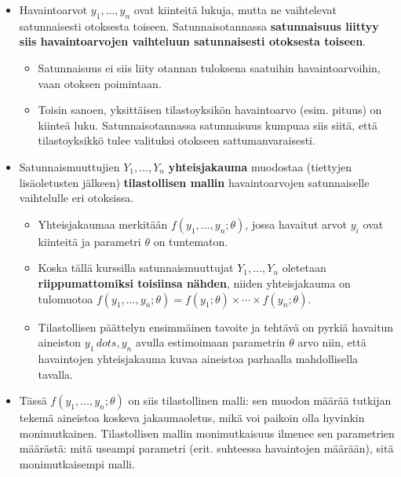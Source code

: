 \documentclass[
]{book}
\providecommand{\tightlist}{%
  \setlength{\itemsep}{0pt}\setlength{\parskip}{0pt}}
\begin{document}
\begin{itemize}
\tightlist
\item
  Havaintoarvot \(y_1, \dots, y_n\) ovat kiinteitä lukuja, mutta ne vaihtelevat satunnaisesti otoksesta toiseen. Satunnaisotannassa \textbf{satunnaisuus liittyy siis havaintoarvojen vaihteluun satunnaisesti otoksesta toiseen}.

  \begin{itemize}
  \tightlist
  \item
    Satunnaisuus ei siis liity otannan tuloksena saatuihin havaintoarvoihin, vaan otoksen poimintaan.
  \item
    Toisin sanoen, yksittäisen tilastoyksikön havaintoarvo (esim. pituus) on kiinteä luku. Satunnaisotannassa satunnaisuus kumpuaa siis siitä, että tilastoyksikkö tulee valituksi otokseen sattumanvaraisesti.
  \end{itemize}
\item
  Satunnaismuuttujien \(Y_1, \ldots, Y_n\) \textbf{yhteisjakauma} muodostaa (tiettyjen lisäoletusten jälkeen) \textbf{tilastollisen mallin} havaintoarvojen satunnaiselle vaihtelulle eri otoksissa.

  \begin{itemize}
  \tightlist
  \item
    Yhteisjakaumaa merkitään \(f(y_1,\dots,y_n;\theta)\), jossa havaitut arvot \(y_i\) ovat kiinteitä ja parametri \(\theta\) on tuntematon.
  \item
    Koska tällä kurssilla satunnaismuuttujat \(Y_1, \ldots, Y_n\) oletetaan \textbf{riippumattomiksi toisiinsa nähden}, niiden yhteisjakauma on tulomuotoa \(f(y_1, \ldots, y_n; \theta) = f(y_1; \theta) \times \cdots \times f(y_n; \theta)\).
  \item
    Tilastollisen päättelyn ensimmäinen tavoite ja tehtävä on pyrkiä havaitun aineiston \(y_1\,dots,y_n\) avulla estimoimaan parametrin \(\theta\) arvo niin, että havaintojen yhteisjakauma kuvaa aineistoa parhaalla mahdollisella tavalla.
  \end{itemize}
\item
  Tässä \(f(y_1, \ldots, y_n; \theta)\) on siis tilastollinen malli: sen muodon määrää tutkijan tekemä aineistoa koskeva jakaumaoletus, mikä voi paikoin olla hyvinkin monimutkainen. Tilastollisen mallin monimutkaisuus ilmenee sen parametrien määrästä: mitä useampi parametri (erit. suhteessa havaintojen määrään), sitä monimutkaisempi malli.


\end{itemize}
\end{document}
